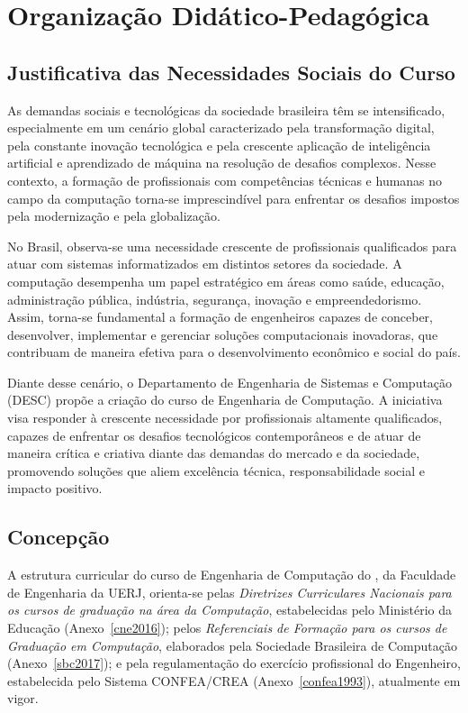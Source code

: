 \chapter{Organização Didático-Pedagógica}
\thispagestyle{plain}

\section{Justificativa das Necessidades Sociais do Curso}

As demandas sociais e tecnológicas da sociedade brasileira têm se intensificado, especialmente em um cenário global caracterizado pela transformação digital, pela constante inovação tecnológica e pela crescente aplicação de inteligência artificial e aprendizado de máquina na resolução de desafios complexos. Nesse contexto, a formação de profissionais com competências técnicas e humanas no campo da computação torna-se imprescindível para enfrentar os desafios impostos pela modernização e pela globalização.

No Brasil, observa-se uma necessidade crescente de profissionais qualificados para atuar com sistemas informatizados em distintos setores da sociedade. A computação desempenha um papel estratégico em áreas como saúde, educação, administração pública, indústria, segurança, inovação e empreendedorismo. Assim, torna-se fundamental a formação de engenheiros capazes de conceber, desenvolver, implementar e gerenciar soluções computacionais inovadoras, que contribuam de maneira efetiva para o desenvolvimento econômico e social do país.

Diante desse cenário, o Departamento de Engenharia de Sistemas e Computação (DESC) propõe a criação do curso de Engenharia de Computação. A iniciativa visa responder à crescente necessidade por profissionais altamente qualificados, capazes de enfrentar os desafios tecnológicos contemporâneos e de atuar de maneira crítica e criativa diante das demandas do mercado e da sociedade, promovendo soluções que aliem excelência técnica, responsabilidade social e impacto positivo.

\section{Concepção}

A estrutura curricular do curso de Engenharia de Computação do \desc, da Faculdade de Engenharia da UERJ, orienta-se pelas \textit{Diretrizes Curriculares Nacionais para os cursos de graduação na área da Computação}, estabelecidas pelo Ministério da Educação (Anexo~\ref{cne2016}); pelos \textit{Referenciais de Formação para os cursos de Graduação em Computação}, elaborados pela Sociedade Brasileira de Computação (Anexo~\ref{sbc2017}); e pela regulamentação do exercício profissional do Engenheiro, estabelecida pelo Sistema CONFEA/CREA (Anexo~\ref{confea1993}), atualmente em vigor.

